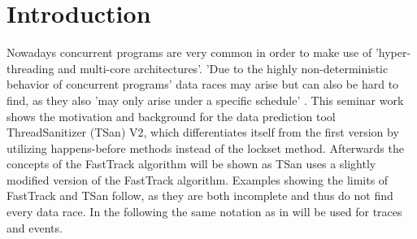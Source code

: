 \documentclass[12pt]{article}
\begin{document}
	\section{Introduction}
	Nowadays concurrent programs are very common in order to make use of 'hyper-threading and multi-core architectures'\cite[p. 14]{SWB-1830643851}. 'Due to the highly non-deterministic behavior of concurrent programs' \cite[p. 1]{sulzmann} data races may arise but can also be hard to find, as they also 'may only arise under a specific schedule' \cite[p. 1]{sulzmann}. This seminar work shows the motivation and background for the data prediction tool ThreadSanitizer (TSan) V2, which differentiates itself from the first version by utilizing happens-before methods instead of the lockset method. Afterwards the concepts of the FastTrack \cite{cormac} algorithm will be shown as TSan uses a slightly modified version of the FastTrack algorithm. Examples showing the limits of FastTrack and TSan follow, as they are both incomplete and thus do not find every data race. In the following the same notation as in \cite{sulzmann} will be used for traces and events.
	
\end{document}
